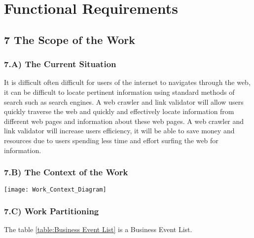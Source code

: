 \documentclass[12pt]{article}
\begin{document}
\section{Functional Requirements}

\subsection{7 The Scope of the Work }

\subsubsection{7.A) The Current Situation}

It is difficult often difficult for users of the internet to navigates through the web, it can be difficult to locate pertinent information using standard methods of search such as search engines. A web crawler and link validator will allow users quickly traverse the web and quickly and effectively locate information from different web pages and information about these web pages. A web crawler and link validator will increase users efficiency, it will be able to save money and resources due to users spending less time and effort surfing the web for information.\newline

\subsubsection{7.B) The Context of the Work }
\texttt{[image: Work\_Context\_Diagram]}
\subsubsection{7.C) Work Partitioning}
The table \ref{table:Business Event List} is a Business Event List.
\end{document}
